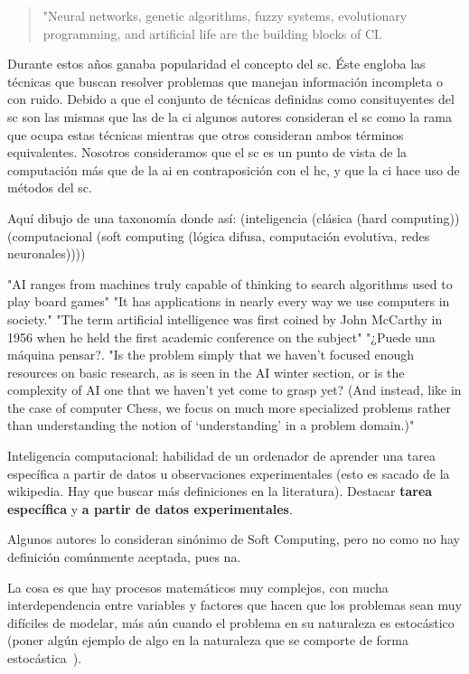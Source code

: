 \blockquote{"Neural networks, genetic algorithms, fuzzy systems, evolutionary programming, and artificial life are the building blocks of CI.}

Durante estos años ganaba popularidad el concepto del \ac{sc}. Éste engloba las técnicas que buscan resolver problemas que manejan información incompleta o con ruido. Debido a que el conjunto de técnicas definidas como consituyentes del \ac{sc} son las mismas que las de la \ac{ci} algunos autores consideran el \ac{sc} como la rama que ocupa estas técnicas mientras que otros consideran ambos términos equivalentes. Nosotros consideramos que el \ac{sc} es un punto de vista de la computación más que de la \ac{ai} en contraposición con el \ac{hc}, y que la \ac{ci} hace uso de métodos del \ac{sc}.

\TODO Aquí dibujo de una taxonomía donde así: (inteligencia (clásica (hard computing)) (computacional (soft computing (lógica difusa, computación evolutiva, redes neuronales))))

"AI ranges from machines truly capable of thinking to search algorithms used to play board games"
"It has applications in nearly every way we use computers in society."
"The term artificial intelligence was first coined by John McCarthy in 1956 when he held the first academic conference on the subject"
"¿Puede una máquina pensar?. 
"Is the problem simply that we haven’t focused
enough resources on basic research, as is seen in the AI winter section, or is the complexity of AI one that we
haven’t yet come to grasp yet? (And instead, like in the case of computer Chess, we focus on much more
specialized problems rather than understanding the notion of ‘understanding’ in a problem domain.)"

Inteligencia computacional: habilidad de un ordenador de aprender una tarea específica a partir de datos u observaciones experimentales (esto es sacado de la wikipedia. Hay que buscar más definiciones en la literatura). Destacar \textbf{tarea específica} y \textbf{a partir de datos experimentales}.

Algunos autores lo consideran sinónimo de Soft Computing, pero no como no hay definición comúnmente aceptada, pues na.

La cosa es que hay procesos matemáticos muy complejos, con mucha interdependencia entre variables y factores que hacen que los problemas sean muy difíciles de modelar, más aún cuando el problema en su naturaleza es estocástico (poner algún ejemplo de algo en la naturaleza que se comporte de forma estocástica~\cite{siddique2013computational}).

